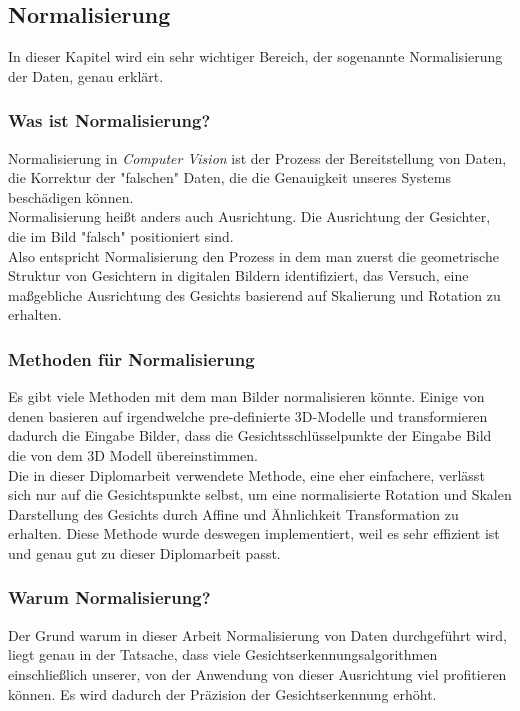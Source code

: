 \subsection{Normalisierung}

In dieser Kapitel wird ein sehr wichtiger Bereich, der sogenannte Normalisierung der Daten, genau erklärt. 

\subsubsection{Was ist Normalisierung?}

Normalisierung in \textit{Computer Vision} ist der Prozess der Bereitstellung von Daten, die Korrektur der "falschen" Daten, die die Genauigkeit unseres Systems beschädigen können.\\ 
Normalisierung heißt anders auch Ausrichtung. 
Die Ausrichtung der Gesichter, die im Bild "falsch" positioniert sind. \\
Also entspricht Normalisierung den Prozess in dem man zuerst die geometrische Struktur von Gesichtern in digitalen Bildern identifiziert, das Versuch, eine maßgebliche Ausrichtung des Gesichts basierend auf Skalierung und Rotation zu erhalten.
\subsubsection{Methoden für Normalisierung}
Es gibt viele Methoden mit dem man Bilder normalisieren könnte. 
Einige von denen basieren auf irgendwelche pre-definierte 3D-Modelle und transformieren dadurch die Eingabe Bilder, dass die Gesichtsschlüsselpunkte der Eingabe Bild die von dem 3D Modell übereinstimmen.
\\
Die in dieser Diplomarbeit verwendete Methode, eine eher einfachere, verlässt sich nur auf die Gesichtspunkte selbst, um eine normalisierte Rotation und Skalen Darstellung des Gesichts durch Affine und Ähnlichkeit Transformation zu erhalten.
Diese Methode wurde deswegen implementiert, weil es sehr effizient ist und genau gut zu dieser Diplomarbeit passt.

\subsubsection{Warum Normalisierung?}
Der Grund warum in dieser Arbeit Normalisierung von Daten durchgeführt wird, liegt genau in der Tatsache, dass viele Gesichtserkennungsalgorithmen einschließlich unserer, von der Anwendung von dieser Ausrichtung viel profitieren können. 
Es wird dadurch der Präzision der Gesichtserkennung erhöht. 


